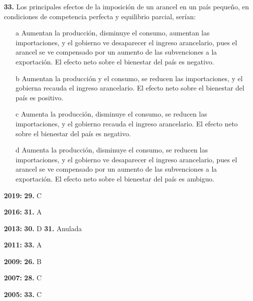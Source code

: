 \documentclass{nuevotema}
\begin{document}

\textbf{33.} Los principales efectos de la imposición de un arancel en un país pequeño, en condiciones de competencia perfecta y equilibrio parcial, serían:

\begin{itemize}
	\item[a] Aumentan la producción, disminuye el consumo, aumentan las importaciones, y el gobierno ve desaparecer el ingreso arancelario, pues el arancel se ve compensado por un aumento de las subvenciones a la exportación. El efecto neto sobre el bienestar del país es negativo.
	\item[b] Aumentan la producción y el consumo, se reducen las importaciones, y el gobierna recauda el ingreso arancelario. El efecto neto sobre el bienestar del país es positivo.
	\item[c] Aumenta la producción, disminuye el consumo, se reducen las importaciones, y el gobierno recauda el ingreso arancelario. El efecto neto sobre el bienestar del país es negativo.
	\item[d] Aumenta la producción, disminuye el consumo, se reducen las importaciones, y el gobierno ve desaparecer el ingreso arancelario, pues el arancel se ve compensado por un aumento de las subvenciones a la exportación. El efecto neto sobre el bienestar del país es ambiguo.
\end{itemize}

\notas

\textbf{2019:} \textbf{29.} C

\textbf{2016:} \textbf{31.} A

\textbf{2013:} \textbf{30.} D \textbf{31.} Anulada

\textbf{2011:} \textbf{33.} A

\textbf{2009:} \textbf{26.} B

\textbf{2007:} \textbf{28.} C

\textbf{2005:} \textbf{33.} C

\bibliografia
\end{document}
